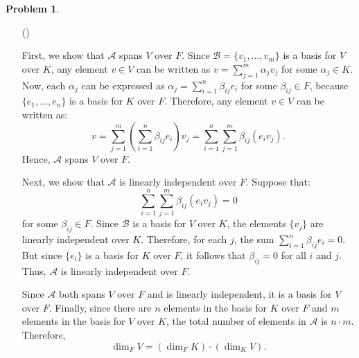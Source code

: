 \documentclass[12pt]{article}
\theoremstyle{definition}
\newtheorem{problem}{Problem}
\newcounter{subq}[problem]
\newenvironment{subproblem}
{\refstepcounter{subq} \begin{itemize} \item[(\alph{subq})]}
{\end{itemize} \medskip}
\begin{document}
\begin{problem}
\begin{subproblem}
\begin{solution}
            First, we show that $\mathcal{A}$ spans $V$ over $F$. Since $\mathcal{B} = \{v_1,\ldots,v_m\}$ is a basis for $V$ over $K$, any element $v \in V$ can be written as $v = \sum_{j=1}^m \alpha_j v_j$ for some $\alpha_j \in K$. Now, each $\alpha_j$ can be expressed as $\alpha_j = \sum_{i=1}^n \beta_{ij} e_i$ for some $\beta_{ij} \in F$, because $\{e_1, \dots, e_n\}$ is a basis for $K$ over $F$. Therefore, any element $v \in V$ can be written as:
            \[
            v = \sum_{j=1}^m \left( \sum_{i=1}^n \beta_{ij} e_i \right) v_j = \sum_{i=1}^n \sum_{j=1}^m \beta_{ij} (e_i v_j).
            \]
            Hence, $\mathcal{A}$ spans $V$ over $F$.
    
            Next, we show that $\mathcal{A}$ is linearly independent over $F$. Suppose that:
            \[
            \sum_{i=1}^n \sum_{j=1}^m \beta_{ij} (e_i v_j) = 0
            \]
            for some $\beta_{ij} \in F$. Since $\mathcal{B}$ is a basis for $V$ over $K$, the elements $\{v_j\}$ are linearly independent over $K$. Therefore, for each $j$, the sum $\sum_{i=1}^n \beta_{ij} e_i = 0$. But since $\{e_i\}$ is a basis for $K$ over $F$, it follows that $\beta_{ij} = 0$ for all $i$ and $j$. Thus, $\mathcal{A}$ is linearly independent over $F$.
    
            Since $\mathcal{A}$ both spans $V$ over $F$ and is linearly independent, it is a basis for $V$ over $F$. Finally, since there are $n$ elements in the basis for $K$ over $F$ and $m$ elements in the basis for $V$ over $K$, the total number of elements in $\mathcal{A}$ is $n \cdot m$. Therefore, 
            \[
            \dim_FV = (\dim_FK) \cdot (\dim_KV).
            \]
        \end{solution}
    \end{subproblem}


\end{problem}
\end{document}
